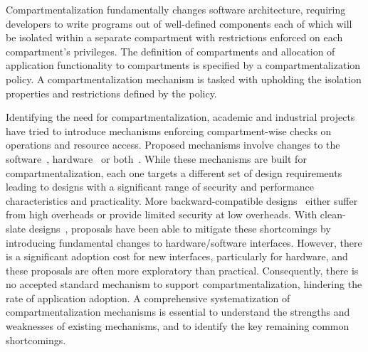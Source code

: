 Compartmentalization fundamentally changes software architecture, requiring
developers to write programs out of well-defined components each of which will
be isolated within a separate compartment with restrictions enforced on each
compartment's privileges.
The definition of compartments and allocation of application functionality to
compartments is specified by a compartmentalization policy.
A compartmentalization mechanism is tasked with upholding the isolation
properties and restrictions defined by the policy.

Identifying the need for compartmentalization, academic and industrial projects
have tried to introduce mechanisms enforcing compartment-wise checks on
operations and resource access.
Proposed mechanisms involve changes to the software~\cite{LittonVE0BD16}, 
hardware~\cite{DuHXZC19XPC,VilanovaBNEV14,SchrammelWSS0MG20Donky,
BhattacharyyaHLGSFP23,ParkLXMK19,ERIMOberwagner19}
or both~\cite{WatsonWNMACDDGL15}.
While these mechanisms are built for compartmentalization, each one targets a
different set of design requirements leading to designs with a significant
range of security and performance characteristics and practicality.
More backward-compatible designs~\cite{ERIMOberwagner19,LittonVE0BD16,ParkLXMK19}
either suffer from high overheads or provide limited security at low
overheads.
With clean-slate designs~\cite{WatsonWNMACDDGL15,BhattacharyyaHLGSFP23,YuWBCS23CAPSTONE}, 
proposals have been able to mitigate these
shortcomings by introducing fundamental changes to hardware/software
interfaces.
However, there is a significant adoption cost for new interfaces,
particularly for hardware, and these proposals are often more exploratory
than practical.
Consequently, there is no accepted standard mechanism to support
compartmentalization, hindering the rate of application adoption.
A comprehensive systematization of compartmentalization mechanisms is
essential to understand the strengths and weaknesses of existing
mechanisms, and to identify the key remaining common shortcomings.

